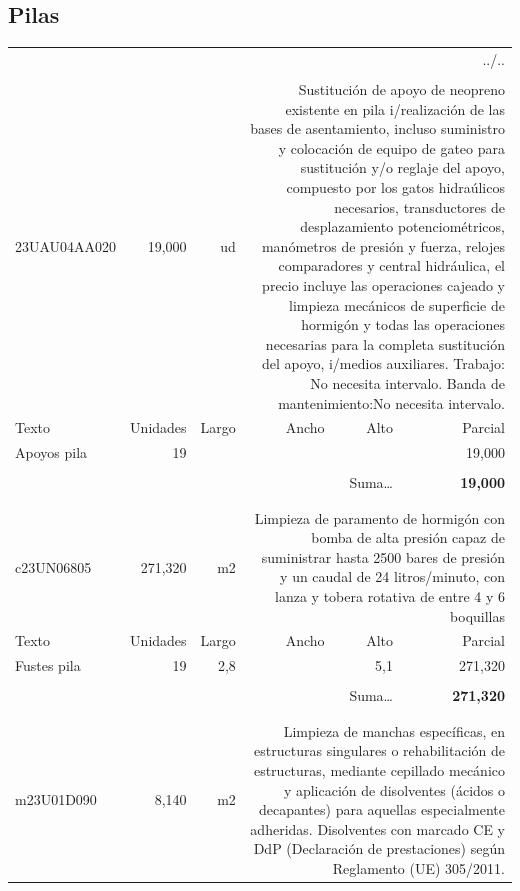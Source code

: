 \documentclass{book}%
\begin{document}
\subsection{Pilas}%
\begin{longtable}{lrrrrr}%
\multicolumn{6}{r}{../..}\\%
\endfoot%
\endlastfoot%
&&&&&\\%
23UAU04AA020&    19,000& ud&\multicolumn{3}{p{6cm}}{\scriptsize Sustitución de apoyo de neopreno existente en pila i/realización de las bases de asentamiento, incluso suministro y colocación de equipo de gateo para sustitución y/o reglaje del apoyo, compuesto por los gatos hidraúlicos necesarios, transductores de desplazamiento potenciométricos, manómetros de presión y fuerza, relojes comparadores y central hidráulica, el precio incluye las operaciones cajeado y limpieza mecánicos de superficie de hormigón y todas las operaciones necesarias para la completa sustitución del apoyo, i/medios auxiliares. Trabajo: No necesita intervalo. Banda de mantenimiento:No necesita intervalo.\normalsize}\\%
Texto&Unidades&Largo&Ancho&Alto&Parcial\\%
\hline%
\multicolumn{1}{p{3.5cm}}{Apoyos pila}&19&&&&    19,000\\%
&&&&&\\%
\multicolumn{5}{r}{Suma\ldots}&\textbf{    19,000}\\%
\hline%
&&&&&\\%
&&&&&\\%
c23UN06805&   271,320& m2&\multicolumn{3}{p{6cm}}{\scriptsize Limpieza de paramento de hormigón con bomba de alta presión capaz de suministrar hasta 2500 bares de presión y un caudal de 24 litros/minuto, con lanza y tobera rotativa de entre 4 y 6 boquillas\normalsize}\\%
Texto&Unidades&Largo&Ancho&Alto&Parcial\\%
\hline%
\multicolumn{1}{p{3.5cm}}{Fustes pila}&19&2,8&&5,1&   271,320\\%
&&&&&\\%
\multicolumn{5}{r}{Suma\ldots}&\textbf{   271,320}\\%
\hline%
&&&&&\\%
&&&&&\\%
m23U01D090&     8,140& m2&\multicolumn{3}{p{6cm}}{\scriptsize Limpieza de manchas específicas, en estructuras singulares o rehabilitación de estructuras, mediante cepillado mecánico y aplicación de disolventes (ácidos o decapantes) para aquellas especialmente adheridas. Disolventes con marcado CE y DdP (Declaración de prestaciones) según Reglamento (UE) 305/2011.\normalsize}\\%

\end{longtable}
\end{document}
